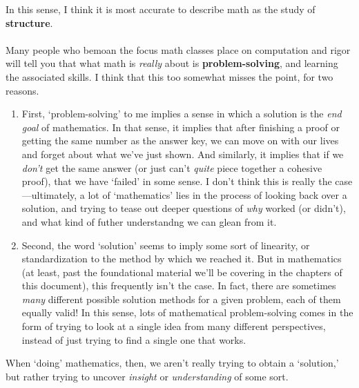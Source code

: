 \documentclass[10pt]{article}
\theoremstyle{definition}
\begin{document}
{In this sense, I think it is most accurate to describe math as the
study of \textbf{structure}.  \\~\\
Many people who bemoan the focus math classes place on computation and
rigor will tell you that what math is \emph{really} about is
\textbf{problem-solving}, and learning the associated skills.  I think
that this too somewhat misses the point, for two reasons.
\begin{enumerate}
\item First, `problem-solving' to me implies a sense in which a
  solution is the \emph{end goal} of mathematics.  In that sense, it
  implies that after finishing a proof or getting the same number as
  the answer key, we can move on with our lives and forget about what
  we've just shown.  And similarly, it implies that if we \emph{don't}
  get the same answer (or just can't \emph{quite} piece together a
  cohesive proof), that we have `failed' in some sense.  I don't think
  this is really the case---ultimately, a lot of `mathematics' lies in
  the process of looking back over a solution, and trying to tease out
  deeper questions of \emph{why} worked (or didn't), and what kind of
  futher understandng we can glean from it.
\item Second, the word `solution' seems to imply some sort of
  linearity, or standardization to the method by which we reached it.
  But in mathematics (at least, past the foundational material we'll
  be covering in the chapters of this document), this frequently isn't
  the case.  In fact, there are sometimes \emph{many} different
  possible solution methods for a given problem, each of them equally
  valid!  In this sense, lots of mathematical problem-solving comes in
  the form of trying to look at a single idea from many different
  perspectives, instead of just trying to find a single one that
  works.
\end{enumerate}
When `doing' mathematics, then, we aren't really trying to obtain a
`solution,' but rather trying to uncover \emph{insight} or
\emph{understanding} of some sort.
}
\end{document}
